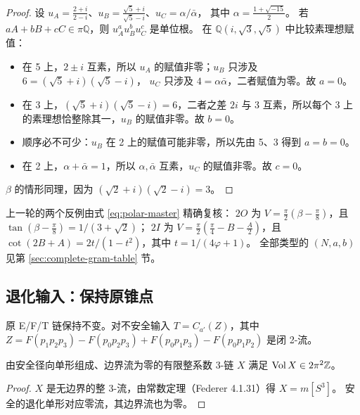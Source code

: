 \begin{proof}
设 $u_A=\frac{2+i}{2-i}$、$u_B=\frac{\sqrt5+i}{\sqrt5-i}$、$u_C=\alpha/\bar\alpha$，
其中 $\alpha=\frac{1+\sqrt{-15}}2$。
若 $aA+bB+cC\in\pi\mathbb Q$，则 $u_A^au_B^bu_C^c$ 是单位根。
在 $\mathbb Q(i,\sqrt3,\sqrt5)$ 中比较素理想赋值：
\begin{itemize}
\item 在 5 上，$2\pm i$ 互素，所以 $u_A$ 的赋值非零；$u_B$ 只涉及 $6=(\sqrt5+i)(\sqrt5-i)$，
  $u_C$ 只涉及 $4=\alpha\bar\alpha$，二者赋值为零。故 $a=0$。
\item 在 3 上，$(\sqrt5+i)(\sqrt5-i)=6$，二者之差 $2i$ 与 3 互素，所以每个 3 上的素理想恰整除其一，$u_B$ 的赋值非零。故 $b=0$。
\item 顺序必不可少：$u_B$ 在 2 上的赋值可能非零，所以先由 5、3 得到 $a=b=0$。
\item 在 2 上，$\alpha+\bar\alpha=1$，所以 $\alpha,\bar\alpha$ 互素，$u_C$ 的赋值非零。故 $c=0$。
\end{itemize}
$\beta$ 的情形同理，因为 $(\sqrt2+i)(\sqrt2-i)=3$。
\end{proof}

上一轮的两个反例由式 \eqref{eq:polar-master} 精确复核：
$2O$ 为 $V=\frac\pi2(\beta-\frac\pi8)$，且 $\tan(\beta-\frac\pi8)=1/(3+\sqrt2)$；
$2I$ 为 $V=\frac\pi2(\frac\pi4-B-\frac A2)$，且 $\cot(2B+A)=2t/(1-t^2)$，其中 $t=1/(4\varphi+1)$。
全部类型的 $(N,a,b)$ 见第 \ref{sec:complete-gram-table} 节。

\subsection{退化输入：保持原锥点}

原 E/F/T 链保持不变。对不安全输入 $T=C_{a'}(Z)$，其中
$Z=F(p_1p_2p_3)-F(p_0p_2p_3)+F(p_0p_1p_3)-F(p_0p_1p_2)$ 是闭 2-流。

\begin{lemma}\label{lem:apex-free}
由安全径向单形组成、边界流为零的有限整系数 3-链 $X$ 满足 $\operatorname{Vol} X\in2\pi^2\mathbb Z$。
\end{lemma}
\begin{proof}
$X$ 是无边界的整 3-流，由常数定理（Federer 4.1.31）得 $X=m[S^3]$。
安全的退化单形对应零流，其边界流也为零。
\end{proof}

